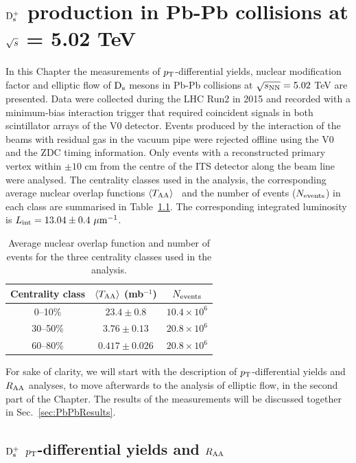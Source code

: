 \chapter{${\rm D_s^+}$ production in Pb-Pb collisions at $\sqrt{s}$ = 5.02 TeV}
\label{chap:PbPb}
In this Chapter the measurements of $p_{\rm T}$-differential yields,
nuclear modification factor and elliptic flow of ${\rm D_s}$ mesons
in Pb-Pb collisions at $\sqrt{s_{\rm NN}} = 5.02$ TeV are presented. Data were
collected during the LHC Run2 in 2015 and recorded with a 
minimum-bias interaction trigger that required coincident signals in 
both scintillator arrays of the V0 detector. Events produced by 
the interaction of the beams with residual gas in the
vacuum pipe were rejected offline using the V0 and the ZDC 
timing information. Only events with a reconstructed primary vertex 
within $\pm 10$ cm from the centre of the ITS detector along
the beam line were analysed. The centrality classes 
used in the analysis, the corresponding 
average nuclear overlap functions $\left\langle T_{\rm AA} \right\rangle$~\cite{ALICE-PUBLIC-2015-008} 
and the number of events ($N_{\rm events}$) in each class 
are summarised in Table~\ref{tab:Nevents}. The corresponding 
integrated luminosity is $L_{\rm int}=13.04\pm0.4~\mathrm{\mu m}^{-1}$.\\
\begin{table}[!h]
	\centering
	\begin{tabular}{ccc}
	\hline
	Centrality class & $\langle T_{\rm AA}\rangle$ (mb$^{-1}$)& $N_{\rm events}$\\
	\hline
	\phantom{0}0--10\% & $23.4\pm0.8$ & $10.4 \times 10^6$ \\
	30--50\% & $3.76\pm0.13$ & $20.8 \times 10^6$\\
	60--80\% & $0.417 \pm 0.026$ & $20.8 \times 10^6$\\
	\hline
	\end{tabular}		
	\caption{Average nuclear overlap function and number of events  for the three centrality classes used in the analysis.}
	\label{tab:Nevents}
\end{table}

For sake of clarity, we will start with the description of $p_{\rm T}$-differential yields and $R_{\rm AA}$ 
analyses, to move afterwards to the analysis of elliptic flow, in the second part of the Chapter. 
The results of the measurements will be discussed together in Sec.~\ref{sec:PbPbResults}.

\section{${\rm D_s^+}$ $p_{\rm T}$-differential yields and $R_{\rm AA}$}
\label{sec:YieldsAndRaa}
